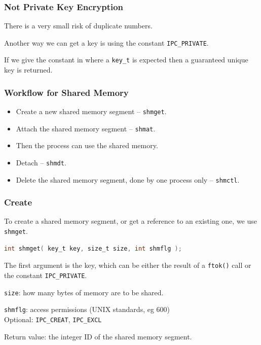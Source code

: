 \begin{frame}
\frametitle{Not Private Key Encryption}

There is a very small risk of duplicate numbers.

Another way we can get a key is using the constant \texttt{IPC\_PRIVATE}. 

If we give the constant in where a \texttt{key\_t} is expected then a guaranteed unique key is returned.

\end{frame}


\begin{frame}
\frametitle{Workflow for Shared Memory}

\begin{itemize}
	\item Create a new shared memory segment -- \texttt{shmget}.
	\item Attach the shared memory segment -- \texttt{shmat}.
	\item Then the process can use the shared memory.
	\item Detach -- \texttt{shmdt}.
	\item Delete the shared memory segment, done by one process only -- \texttt{shmctl}.
\end{itemize}

\end{frame}


\begin{frame}[fragile]
\frametitle{Create}

To create a shared memory segment, or get a reference to an existing one, we use \texttt{shmget}.

\begin{lstlisting}[language=C]
int shmget( key_t key, size_t size, int shmflg );
\end{lstlisting}

The first argument is the key, which can be either the result of a \texttt{ftok()} call or the constant \texttt{IPC\_PRIVATE}.

\texttt{size}: how many bytes of memory are to be shared.

\texttt{shmflg}: access permissions (UNIX standards, eg 600)\\
\quad Optional: \texttt{IPC\_CREAT}, \texttt{IPC\_EXCL}

Return value: the integer ID of the shared memory segment.
\end{frame}

